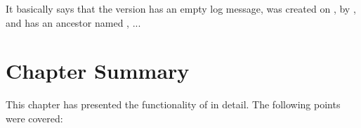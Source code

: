 \documentclass[a4paper,10pt,twoside]{book}
\begin{document}

It basically says that the version  has an empty log message, was created on , by , and has an ancestor named , ...





\section{Chapter Summary}


This chapter has presented the functionality of \MC in detail.
The following points were covered:
\end{document}
